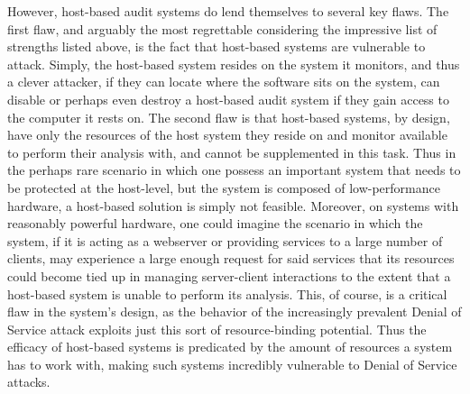 \documentclass{acm_proc_article-sp}
\begin{document}
    However, host-based audit systems do lend themselves to several key flaws. The first flaw, and arguably the most regrettable considering the impressive list of strengths listed above, is the fact that host-based systems are vulnerable to attack. Simply, the host-based system resides on the system it monitors, and thus a clever attacker, if they can locate where the software sits on the system, can disable or perhaps even destroy a host-based audit system if they gain access to the computer it rests on. The second flaw is that host-based systems, by design, have only the resources of the host system they reside on and monitor available to perform their analysis with, and cannot be supplemented in this task. Thus in the perhaps rare scenario in which one possess an important system that needs to be protected at the host-level, but the system is composed of low-performance hardware, a host-based solution is simply not feasible. Moreover, on systems with reasonably powerful hardware, one could imagine the scenario in which the system, if it is acting as a webserver or providing services to a large number of clients, may experience a large enough request for said services that its resources could become tied up in managing server-client interactions to the extent that a host-based system is unable to perform its analysis. This, of course, is a critical flaw in the system's design, as the behavior of the increasingly prevalent Denial of Service attack exploits just this sort of resource-binding potential. Thus the efficacy of host-based systems is predicated by the amount of resources a system has to work with, making such systems incredibly vulnerable to Denial of Service attacks.
    		
\end{document}
